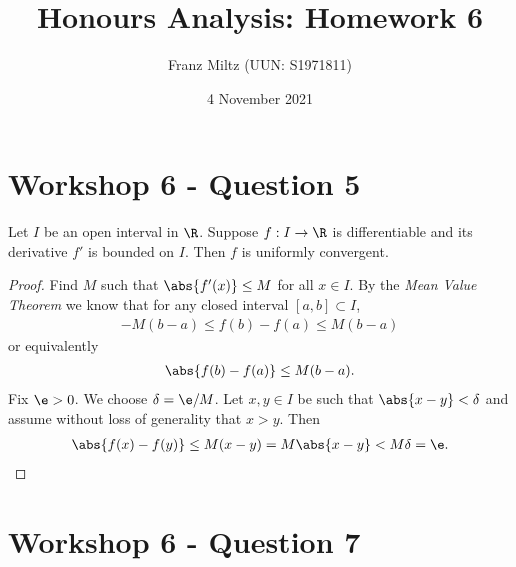 \documentclass{article}
\begin{document}
\title{Honours Analysis: Homework 6}
\author{Franz Miltz (UUN: S1971811)}
\date{4 November 2021}
\maketitle

\section*{Workshop 6 - Question 5}
\begin{claim*}
   Let $I$ be an open interval in $\R$. Suppose $f:I\to\R$ is differentiable
   and its derivative $f'$ is bounded on $I$. Then $f$ is uniformly convergent.
\end{claim*}
\begin{proof}
   Find $M$ such that $\abs{f'(x)} \leq M$ for all $x\in I$. By the
   \emph{Mean Value Theorem} we know that for any closed interval $[a,b]\subset I$,
   \begin{align*}
      -M(b-a) \leq f(b) - f(a) \leq M(b-a)
   \end{align*}
   or equivalently
   \begin{align*}
      \abs{f(b)-f(a)} \leq M(b-a).
   \end{align*}
   Fix $\e>0$. We choose $\delta = \e/M$. Let $x,y\in I$ be such that $\abs{x-y}<\delta$
   and assume without loss of generality that $x>y$. Then
   \begin{align*}
      \abs{f(x) - f(y)} \leq M(x-y) = M\abs{x-y} < M\delta = \e.
   \end{align*}
\end{proof}

\section*{Workshop 6 - Question 7}
\end{document}
